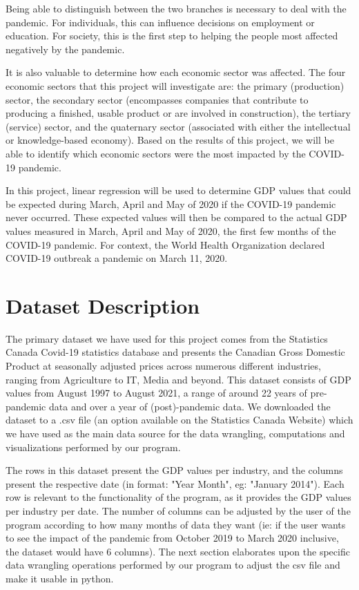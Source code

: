 \documentclass[fontsize=11pt]{article}
\begin{document}
Being able to distinguish between the two branches is necessary to deal with the pandemic. For individuals, this can influence decisions on employment or education. For society,  this is the first step to helping the people most affected negatively by the pandemic.

It is also valuable to determine how each economic sector was affected. The four economic sectors that this project will investigate are: the primary (production) sector, the secondary sector (encompasses companies that contribute to producing a finished, usable product or are involved in construction), the tertiary (service) sector, and the quaternary sector (associated with either the intellectual or knowledge-based economy). Based on the results of this project, we will be able to identify which economic sectors were the most impacted by the COVID-19 pandemic. 

In this project, linear regression will be used to determine GDP values that could be expected during March, April and May of 2020 if the COVID-19 pandemic never occurred. These expected values will then be compared to the actual GDP values measured in March, April and May of 2020, the first few months of the COVID-19 pandemic. For context, the World Health Organization declared COVID-19 outbreak a pandemic on March 11, 2020. 


\section*{Dataset Description}


The primary dataset we have used for this project comes from the Statistics Canada Covid-19 statistics database and presents the Canadian Gross Domestic Product at seasonally adjusted prices across numerous different industries, ranging from Agriculture to IT, Media and beyond. This dataset consists of GDP values from August 1997 to August 2021, a range of around 22 years of pre-pandemic data and over a year of (post)-pandemic data. We downloaded the dataset to a .csv file (an option available on the Statistics Canada Website) which we have used as the main data source for the data wrangling, computations and visualizations performed by our program.

\medskip

The rows in this dataset present the GDP values per industry, and the columns present the respective date (in format: "Year Month", eg: "January 2014"). Each row is relevant to the functionality of the program, as it provides the GDP values per industry per date. The number of columns can be adjusted by the user of the program according to how many months of data they want (ie: if the user wants to see the impact of the pandemic from October 2019 to March 2020 inclusive, the dataset would have 6 columns). The next section elaborates upon the specific data wrangling operations performed by our program to adjust the csv file and make it usable in python.
\end{document}
